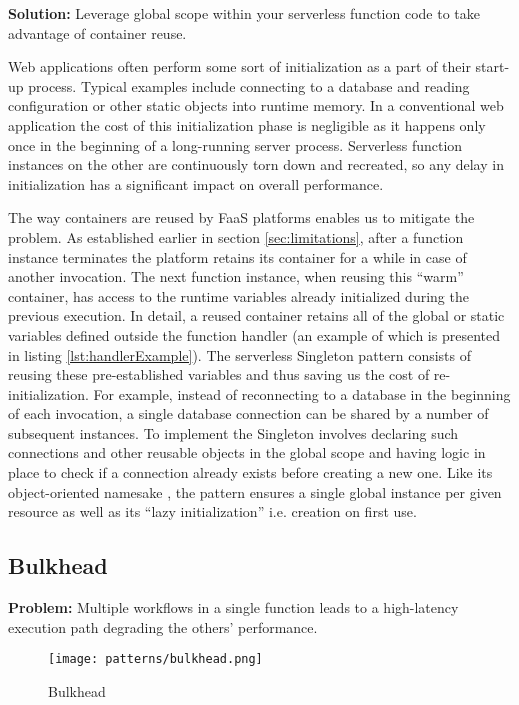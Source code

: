 \textbf{Solution:} Leverage global scope within your serverless function code to take advantage of container reuse.

Web applications often perform some sort of initialization as a part of their start-up process. Typical examples include connecting to a database and reading configuration or other static objects into runtime memory. In a conventional web application the cost of this initialization phase is negligible as it happens only once in the beginning of a long-running server process. Serverless function instances on the other are continuously torn down and recreated, so any delay in initialization has a significant impact on overall performance.

The way containers are reused by FaaS platforms enables us to mitigate the problem. As established earlier in section \ref{sec:limitations}, after a function instance terminates the platform retains its container for a while in case of another invocation. The next function instance, when reusing this ``warm'' container, has access to the runtime variables already initialized during the previous execution. In detail, a reused container retains all of the global or static variables defined outside the function handler (an example of which is presented in listing \ref{lst:handlerExample}). The serverless Singleton pattern consists of reusing these pre-established variables and thus saving us the cost of re-initialization. For example, instead of reconnecting to a database in the beginning of each invocation, a single database connection can be shared by a number of subsequent instances. To implement the Singleton involves declaring such connections and other reusable objects in the global scope and having logic in place to check if a connection already exists before creating a new one. Like its object-oriented namesake \parencite{gamma94designPatterns}, the pattern ensures a single global instance per given resource as well as its ``lazy initialization'' i.e. creation on first use. \parencite{aws18serverlessLens}

\subsection{Bulkhead} \label{subsec:Bulkhead}

\textbf{Problem:} Multiple workflows in a single function leads to a high-latency execution path degrading the others' performance.

\begin{figure}[h]
  \centering
  \texttt{[image: patterns/bulkhead.png]}
  \caption{Bulkhead}
  \label{fig:bulkhead}
\end{figure}

